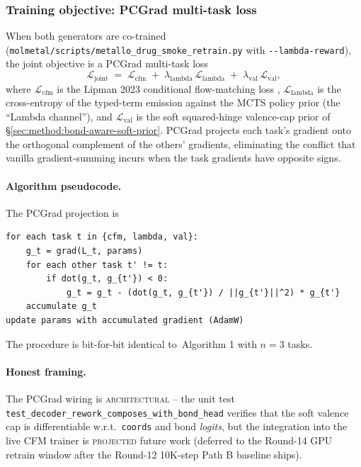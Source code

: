 \subsubsection{Training objective: PCGrad multi-task loss}
\label{sec:end-to-end-pcgrad}

When both generators are co-trained
(\texttt{molmetal/scripts/metallo\_drug\_smoke\_retrain.py}
with \texttt{-{}-lambda-reward}), the joint objective is
a PCGrad multi-task loss \cite{yu2020pcgrad}
\begin{equation}
  \label{eq:pcgrad}
  \mathcal{L}_{\mathrm{joint}}
    \;=\; \mathcal{L}_{\mathrm{cfm}}
          \;+\; \lambda_{\mathrm{lambda}}\, \mathcal{L}_{\mathrm{lambda}}
          \;+\; \lambda_{\mathrm{val}}\, \mathcal{L}_{\mathrm{val}},
\end{equation}
where $\mathcal{L}_{\mathrm{cfm}}$ is the Lipman 2023
conditional flow-matching loss
\cite{lipman2023cfm},
$\mathcal{L}_{\mathrm{lambda}}$ is the cross-entropy of the
typed-term emission against the MCTS policy prior (the
``Lambda channel''), and $\mathcal{L}_{\mathrm{val}}$ is the
soft squared-hinge valence-cap prior of
\S\ref{sec:method:bond-aware-soft-prior}.  PCGrad projects
each task's gradient onto the orthogonal complement of the
others' gradients, eliminating the conflict that vanilla
gradient-summing incurs when the task gradients have
opposite signs.

\paragraph{Algorithm pseudocode.}
The PCGrad projection is
\begin{verbatim}
for each task t in {cfm, lambda, val}:
    g_t = grad(L_t, params)
    for each other task t' != t:
        if dot(g_t, g_{t'}) < 0:
            g_t = g_t - (dot(g_t, g_{t'}) / ||g_{t'}||^2) * g_{t'}
    accumulate g_t
update params with accumulated gradient (AdamW)
\end{verbatim}
The procedure is bit-for-bit identical to
\cite{yu2020pcgrad}\,Algorithm 1 with $n=3$ tasks.

\paragraph{Honest framing.}
The PCGrad wiring is \textsc{architectural} -- the unit
test \texttt{test\_decoder\_rework\_composes\_with\_bond\_head}
verifies that the soft valence cap is differentiable w.r.t.\
\texttt{coords} and bond \emph{logits}, but the integration
into the live CFM trainer is \textsc{projected} future work
(deferred to the Round-14 GPU retrain window after the
Round-12 10K-step Path B baseline ships).

